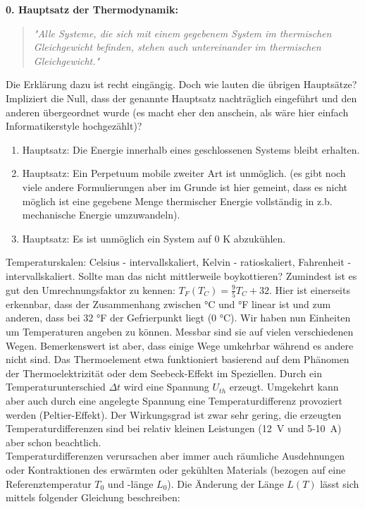\textbf{0. Hauptsatz der Thermodynamik:}
\begin{quote}
    \textit{"}\textit{Alle Systeme, die sich mit einem gegebenem System im thermischen Gleichgewicht befinden, stehen auch untereinander im thermischen Gleichgewicht."}
\end{quote}
Die Erklärung dazu ist recht eingängig. Doch wie lauten die übrigen Hauptsätze? Impliziert die Null, dass der genannte Hauptsatz nachträglich eingeführt und
den anderen übergeordnet wurde (es macht eher den anschein, als wäre hier einfach Informatikerstyle hochgezählt)?

\begin{enumerate}
    \item Hauptsatz: Die Energie innerhalb eines geschlossenen Systems bleibt erhalten.
    \item Hauptsatz: Ein Perpetuum mobile zweiter Art ist unmöglich. (es gibt noch viele andere Formulierungen aber im Grunde ist hier gemeint, dass es nicht
    möglich ist eine gegebene Menge thermischer Energie vollständig in z.b. mechanische Energie umzuwandeln).
    \item Hauptsatz: Es ist unmöglich ein System auf 0 K abzukühlen.
\end{enumerate}

Temperaturskalen: Celsius - intervallskaliert, Kelvin - ratioskaliert, Fahrenheit - intervallskaliert. Sollte man das nicht mittlerweile boykottieren?
Zumindest ist es gut den Umrechnungsfaktor zu kennen: \( T_F(T_C) = \frac{9}{5} T_C + 32 \). Hier ist einerseits erkennbar, dass der
Zusammenhang zwischen °C und °F linear ist und zum anderen, dass bei \SI{32}{} °F der Gefrierpunkt liegt (\SI{0}{} °C). Wir haben nun Einheiten um Temperaturen
angeben zu können. Messbar sind sie auf vielen verschiedenen Wegen. Bemerkenswert ist aber, dass einige Wege umkehrbar während es andere nicht sind. Das Thermoelement
etwa funktioniert basierend auf dem Phänomen der Thermoelektrizität oder dem Seebeck-Effekt im Speziellen. Durch ein Temperaturunterschied \(\Delta t\) wird eine
Spannung \(U_{th}\) erzeugt. Umgekehrt kann aber auch durch eine angelegte Spannung eine Temperaturdifferenz provoziert werden (Peltier-Effekt). Der Wirkungsgrad
ist zwar sehr gering, die erzeugten Temperaturdifferenzen sind bei relativ kleinen Leistungen (\SI{12}{V} und \SI{5}{}-\SI{10}{A}) aber schon beachtlich.\\

Temperaturdifferenzen verursachen aber immer auch räumliche Ausdehnungen oder Kontraktionen des erwärmten oder gekühlten Materials (bezogen auf eine Referenztemperatur \(T_0\)
und -länge \(L_0\)). Die Änderung der Länge \(L(T)\) lässt sich mittels folgender Gleichung beschreiben:

